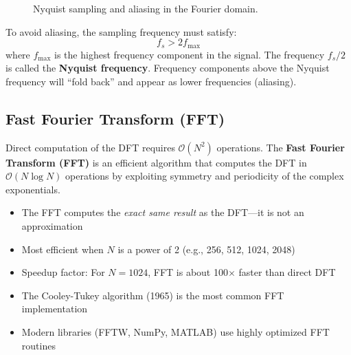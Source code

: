 \begin{figure}[htbp]
\centering

\caption{Nyquist sampling and aliasing in the Fourier domain.}
\label{fig:nyquist_sampling_fourier}
\end{figure}

\begin{warningbox}[title=Nyquist Sampling Theorem]
To avoid aliasing, the sampling frequency must satisfy:
\[
f_s > 2 f_{\max}
\]
where $f_{\max}$ is the highest frequency component in the signal. The frequency $f_s/2$ is called the \textbf{Nyquist frequency}. Frequency components above the Nyquist frequency will ``fold back'' and appear as lower frequencies (aliasing).
\end{warningbox}

\subsection{Fast Fourier Transform (FFT)}

Direct computation of the DFT requires $\mathcal{O}(N^2)$ operations. The \textbf{Fast Fourier Transform (FFT)} is an efficient algorithm that computes the DFT in $\mathcal{O}(N \log N)$ operations by exploiting symmetry and periodicity of the complex exponentials.

\begin{keyconceptbox}[title=FFT Key Points]
\begin{itemize}
    \item The FFT computes the \textit{exact same result} as the DFT---it is not an approximation
    \item Most efficient when $N$ is a power of 2 (e.g., 256, 512, 1024, 2048)
    \item Speedup factor: For $N = 1024$, FFT is about 100$\times$ faster than direct DFT
    \item The Cooley-Tukey algorithm (1965) is the most common FFT implementation
    \item Modern libraries (FFTW, NumPy, MATLAB) use highly optimized FFT routines
\end{itemize}
\end{keyconceptbox}

